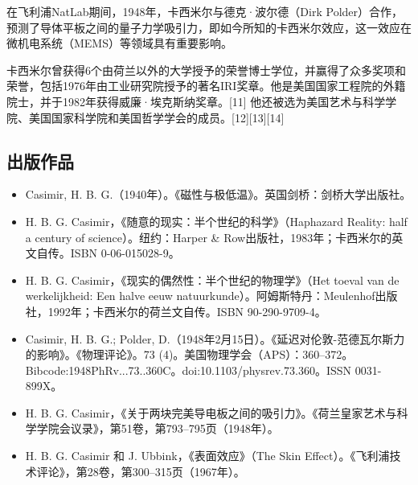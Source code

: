 在飞利浦NatLab期间，1948年，卡西米尔与德克·波尔德（Dirk Polder）合作，预测了导体平板之间的量子力学吸引力，即如今所知的卡西米尔效应，这一效应在微机电系统（MEMS）等领域具有重要影响。

卡西米尔曾获得6个由荷兰以外的大学授予的荣誉博士学位，并赢得了众多奖项和荣誉，包括1976年由工业研究院授予的著名IRI奖章。他是美国国家工程院的外籍院士，并于1982年获得威廉·埃克斯纳奖章。[11] 他还被选为美国艺术与科学学院、美国国家科学院和美国哲学学会的成员。[12][13][14]
\subsection{出版作品}
\begin{itemize}
\item Casimir, H. B. G.（1940年）。《磁性与极低温》。英国剑桥：剑桥大学出版社。
\item H. B. G. Casimir，《随意的现实：半个世纪的科学》（Haphazard Reality: half a century of science）。纽约：Harper & Row出版社，1983年；卡西米尔的英文自传。ISBN 0-06-015028-9。
\item H. B. G. Casimir，《现实的偶然性：半个世纪的物理学》（Het toeval van de werkelijkheid: Een halve eeuw natuurkunde）。阿姆斯特丹：Meulenhof出版社，1992年；卡西米尔的荷兰文自传。ISBN 90-290-9709-4。
\item Casimir, H. B. G.; Polder, D.（1948年2月15日）。《延迟对伦敦-范德瓦尔斯力的影响》。《物理评论》。73 (4)。美国物理学会（APS）：360–372。Bibcode:1948PhRv...73..360C。doi:10.1103/physrev.73.360。ISSN 0031-899X。
\item H. B. G. Casimir，《关于两块完美导电板之间的吸引力》。《荷兰皇家艺术与科学学院会议录》，第51卷，第793–795页（1948年）。
\item H. B. G. Casimir 和 J. Ubbink，《表面效应》（The Skin Effect）。《飞利浦技术评论》，第28卷，第300–315页（1967年）。
\end{itemize}